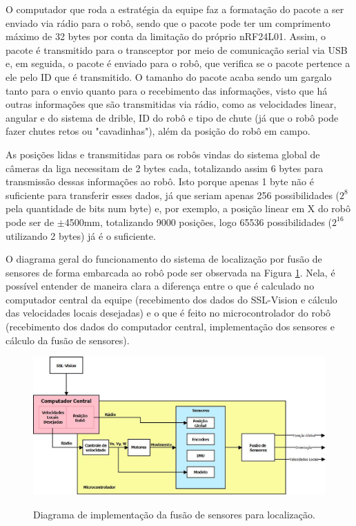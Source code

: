 \documentclass[acronym, symbols, table, deposito]{fei}
\begin{document}
		O computador que roda a estratégia da equipe faz a formatação do pacote a ser enviado via rádio para o robô, sendo que o pacote pode ter um comprimento máximo de 32 bytes por conta da limitação do próprio nRF24L01. Assim, o pacote é transmitido para o transceptor por meio de comunicação serial via USB e, em seguida, o pacote é enviado para o robô, que verifica se o pacote pertence a ele pelo ID que é transmitido. O tamanho do pacote acaba sendo um gargalo tanto para o envio quanto para o recebimento das informações, visto que há outras informações que são transmitidas via rádio, como as velocidades linear, angular e do sistema de drible, ID do robô e tipo de chute (já que o robô pode fazer chutes retos ou "cavadinhas"), além da posição do robô em campo.
		
		As posições lidas e transmitidas para os robôs vindas do sistema global de câmeras da liga necessitam de 2 bytes cada, totalizando assim 6 bytes para transmissão dessas informações ao robô. Isto porque apenas 1 byte não é suficiente para transferir esses dados, já que seriam apenas 256 possibilidades ($2^8$ pela quantidade de bits num byte) e, por exemplo, a posição linear em X do robô pode ser de $\pm$4500mm, totalizando 9000 posições, logo 65536 possibilidades ($2^{16}$ utilizando 2 bytes) já é o suficiente.
		
		O diagrama geral do funcionamento do sistema de localização por fusão de sensores de forma embarcada ao robô pode ser observada na Figura \ref{fig:diagrama_implementacao}. Nela, é possível entender de maneira clara a diferença entre o que é calculado no computador central da equipe (recebimento dos dados do SSL-Vision e cálculo das velocidades locais desejadas) e o que é feito no microcontrolador do robô (recebimento dos dados do computador central, implementação dos sensores e cálculo da fusão de sensores).
		
		\begin{figure}[!htb]
			\centering
			\caption{Diagrama de implementação da fusão de sensores para localização.}
			\includegraphics[width=1.00\textwidth]{diagrama_fluxo_implementacao.jpeg}
			\label{fig:diagrama_implementacao}
		\end{figure}
	
\end{document}
